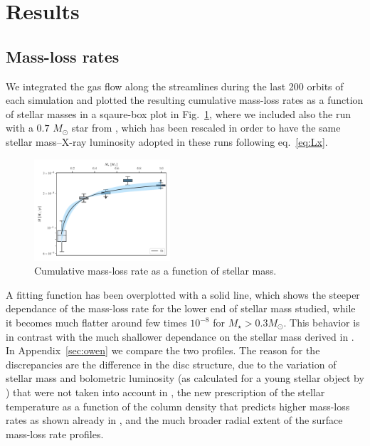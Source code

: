 \documentclass{aa}
\begin{document}
\section{Results}\label{sec:results}

\subsection{Mass-loss rates}\label{sec:mdot}
We integrated the gas flow along the streamlines during the last 200 orbits of each simulation and plotted the resulting cumulative mass-loss rates as a function of stellar masses in a sqaure-box plot in Fig.~\ref{fig:Mdot}, where we included also the run with a $0.7$ $M_\odot$ star from , which has been rescaled in order to have the same stellar mass--X-ray luminosity adopted in these runs following eq.~\ref{eq:Lx}.
\begin{figure}
  \centering
  \includegraphics[width=0.45\textwidth]{mdot}
  \caption{Cumulative mass-loss rate as a function of stellar mass. \label{fig:Mdot}}
\end{figure}
A fitting function has been overplotted with a solid line, which shows the steeper dependance of the mass-loss rate for the lower end of stellar mass studied, while it becomes much flatter around few times $10^{-8}$ for $M_\star > 0.3 M_\odot$.
This behavior is in contrast with the much shallower dependance on the stellar mass derived in . In Appendix~\ref{sec:owen} we compare the two profiles.
The reason for the discrepancies are the difference in the disc structure, due to the variation of stellar mass and bolometric luminosity (as calculated for a young stellar object by ) that were not taken into account in , the new prescription of the stellar temperature as a function of the column density that predicts higher mass-loss rates as shown already in , and the much broader radial extent of the surface mass-loss rate profiles.
\end{document}
